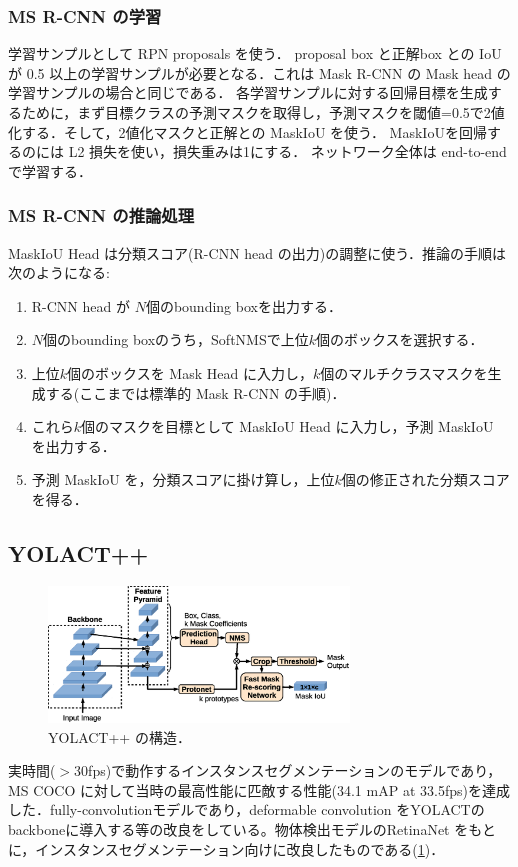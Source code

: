 \documentclass[originalpaper]{jsaiart}     %
\begin{document}
\subsubsection{MS R-CNN の学習}
学習サンプルとして RPN proposals を使う．
proposal box と正解box との IoU が 0.5 以上の学習サンプルが必要となる．これは Mask R-CNN の Mask head の学習サンプルの場合と同じである．
各学習サンプルに対する回帰目標を生成するために，まず目標クラスの予測マスクを取得し，予測マスクを閾値=0.5で2値化する．そして，2値化マスクと正解との MaskIoU を使う．
MaskIoUを回帰するのには L2 損失を使い，損失重みは1にする．
ネットワーク全体は end-to-end で学習する．
\subsubsection{MS R-CNN の推論処理}
MaskIoU Head は分類スコア(R-CNN head の出力)の調整に使う．推論の手順は次のようになる:
\begin{enumerate}
    \item R-CNN head が $N$個のbounding boxを出力する．
    \item $N$個のbounding boxのうち，SoftNMS\cite{BSCD17}で上位$k$個のボックスを選択する．
    \item 上位$k$個のボックスを Mask Head に入力し，$k$個のマルチクラスマスクを生成する(ここまでは標準的 Mask R-CNN の手順)．
    \item これら$k$個のマスクを目標として MaskIoU Head に入力し，予測 MaskIoU を出力する．
    \item 予測 MaskIoU を，分類スコアに掛け算し，上位$k$個の修正された分類スコアを得る．
\end{enumerate}

\subsection{YOLACT++}
\begin{figure}[tb]
    \begin{center}
        \includegraphics[width=8cm,clip]{fig/archi_YOLACT++.eps}
    \end{center}
    \caption{ YOLACT++ の構造．}
    \label{fig:archi_yolactpp}
\end{figure}  
実時間(${>}$30fps)で動作するインスタンスセグメンテーションのモデルであり，MS COCO に対して当時の最高性能に匹敵する性能(34.1 mAP at 33.5fps)を達成した\cite{BZXL20}．fully-convolutionモデルであり，deformable convolution をYOLACT\cite{BZXL19}のbackboneに導入する等の改良をしている。物体検出モデルのRetinaNet\cite{LGGHD17} をもとに，インスタンスセグメンテーション向けに改良したものである(\ref{fig:archi_yolactpp})．
\end{document}
